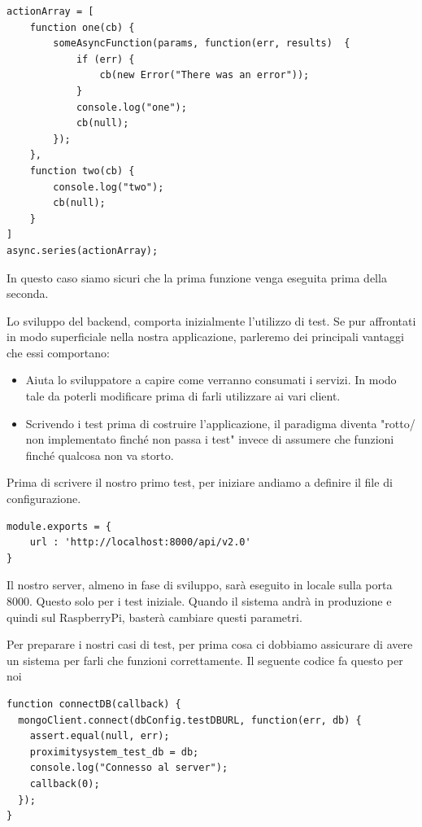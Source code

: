 \begin{lstlisting}[caption={operazioni sincrone}, style=javaScriptCode]
actionArray = [
	function one(cb) {
		someAsyncFunction(params, function(err, results)  {
			if (err) {
				cb(new Error("There was an error"));
			}
			console.log("one");
			cb(null);
		});
	},
	function two(cb) {
		console.log("two");
		cb(null);
	}
]
async.series(actionArray);
\end{lstlisting}

In questo caso siamo sicuri che la prima funzione venga eseguita prima della seconda.

Lo sviluppo del backend, comporta inizialmente l'utilizzo di test. Se pur affrontati in modo superficiale nella nostra applicazione, parleremo dei principali vantaggi che essi comportano:
\begin{itemize}
\item Aiuta lo sviluppatore a capire come verranno consumati i servizi. In modo tale da poterli modificare prima di farli utilizzare ai vari client.
\item Scrivendo i test prima di costruire l'applicazione, il paradigma diventa "rotto/ non implementato finché non passa i test" invece di assumere che funzioni finché qualcosa non va storto.
\end{itemize}

Prima di scrivere il nostro primo test, per iniziare andiamo a definire il file di configurazione.
 
\begin{lstlisting}[caption={test/config/test\_config.js}, style=javaScriptCode]
module.exports = {
	url : 'http://localhost:8000/api/v2.0'
}
\end{lstlisting}

Il nostro server, almeno in fase di sviluppo, sarà eseguito in locale sulla porta 8000. Questo solo per i test iniziale. 
Quando il sistema andrà in produzione e quindi sul RaspberryPi, basterà cambiare questi parametri.

Per preparare i nostri casi di test, per prima cosa ci dobbiamo assicurare di avere un sistema per farli che funzioni correttamente. 
Il seguente codice fa questo per noi

\begin{lstlisting}[caption={test/config/setup\_tests.js - connectDB}, style=javaScriptCode]
function connectDB(callback) {
  mongoClient.connect(dbConfig.testDBURL, function(err, db) {
    assert.equal(null, err);
    proximitysystem_test_db = db;
    console.log("Connesso al server");
    callback(0);
  });
}
\end{lstlisting}

